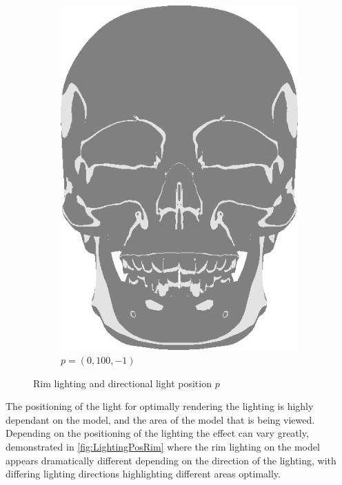 \begin{figure}[h]
\begin{subfigure}[b]{0.22\textwidth}
        \includegraphics[width=\textwidth]{img/Lighting/Directional(100,-1).png}
        \caption{$p = (0,100,-1)$}
        \label{fig:LightingPosDir3}
    \end{subfigure}
\caption{Rim lighting and directional light position $p$}
 \label{fig:LightingPosRim}
 \end{figure}

The positioning of the light for optimally rendering the lighting is highly dependant on the model, and the area of 
the model that is being viewed. Depending on the positioning of the lighting the effect can vary greatly, 
demonstrated in \autoref{fig:LightingPosRim} where the rim lighting on the model appears dramatically different 
depending on the direction of the lighting, with differing lighting directions highlighting different areas optimally.

